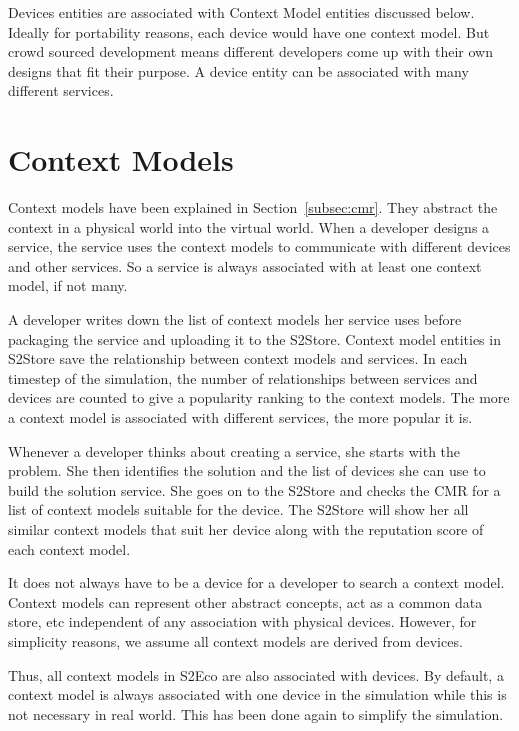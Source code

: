 Devices entities are associated with Context Model entities discussed below. Ideally for portability reasons, each device would have one context model. But crowd sourced development means different developers come up with their own designs that fit their purpose. A device entity can be associated with many different services.

\section{Context Models}
\label{sec:context_models}

Context models have been explained in Section~\ref{subsec:cmr}. They abstract the context in a physical world into the virtual world. When a developer designs a service, the service uses the context models to communicate with different devices and other services. So a service is always associated with at least one context model, if not many.

A developer writes down the list of context models her service uses before packaging the service and uploading it to the S2Store. Context model entities in S2Store save the relationship between context models and services. In each timestep of the simulation, the number of relationships between services and devices are counted to give a popularity ranking to the context models. The more a context model is associated with different services, the more popular it is.

Whenever a developer thinks about creating a service, she starts with the problem. She then identifies the solution and the list of devices she can use to build the solution service. She goes on to the S2Store and checks the CMR for a list of context models suitable for the device. The S2Store will show her all similar context models that suit her device along with the reputation score of each context model.

It does not always have to be a device for a developer to search a context model. Context models can represent other abstract concepts, act as a common data store, etc independent of any association with physical devices. However, for simplicity reasons, we assume all context models are derived from devices.

Thus, all context models in S2Eco are also associated with devices. By default, a context model is always associated with one device in the simulation while this is not necessary in real world. This has been done again to simplify the simulation.

